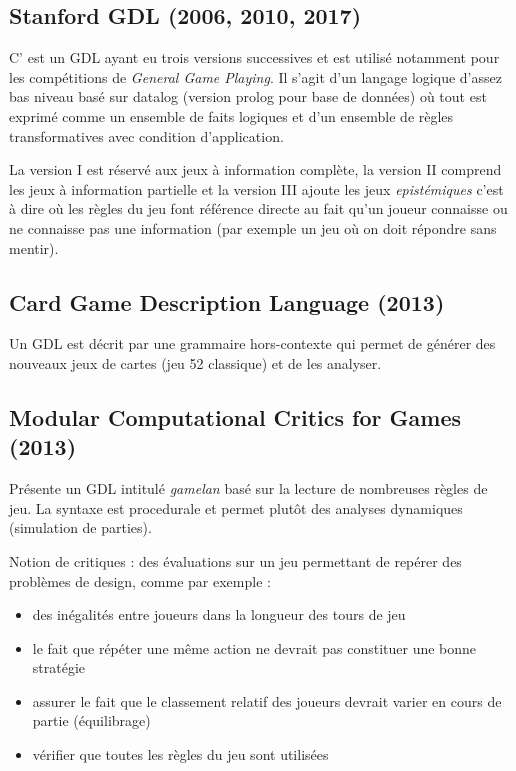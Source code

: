 \documentclass[a4paper,11pt]{article}
\begin{document}
\subsection{Stanford GDL (2006, 2010, 2017) \cite{love2006general, thielscher2010general, thielscher2017gdl} } 
C' est un GDL ayant eu trois versions successives
et
est utilisé notamment pour les compétitions de \emph{General Game Playing}.
Il s'agit d'un langage logique d'assez bas niveau basé sur datalog (version prolog pour base de données) où tout est exprimé comme un ensemble de faits logiques et d'un ensemble de règles transformatives avec condition d'application.


La version I est réservé aux jeux à information complète, la version II comprend les jeux à information partielle et la version III ajoute les jeux \emph{epistémiques} c'est à dire où les règles du jeu font référence directe au fait qu'un joueur connaisse ou ne connaisse pas une information (par exemple un jeu où on doit répondre sans mentir).



\subsection{Card Game Description Language (2013) \cite {font2013card}} 
Un GDL est décrit par une grammaire hors-contexte qui permet de générer des nouveaux jeux de cartes (jeu 52 classique) et de les analyser.





\subsection{Modular Computational Critics for Games (2013)  \cite{osborn2013modular} } 

Présente un GDL intitulé {\it gamelan} basé sur la lecture de nombreuses règles de jeu. La syntaxe est procedurale et permet plutôt des analyses dynamiques (simulation de parties).

Notion de critiques : des évaluations sur un jeu permettant de repérer des problèmes de design, comme  par exemple  : 
\begin{itemize}
\item  des inégalités entre joueurs dans la longueur des tours de jeu 
\item  le fait que répéter une même action ne devrait pas constituer une bonne stratégie
\item assurer le fait que le classement relatif des joueurs devrait varier en cours de partie (équilibrage) 
\item vérifier que toutes les règles du jeu sont utilisées
\end{itemize}
\end{document}
